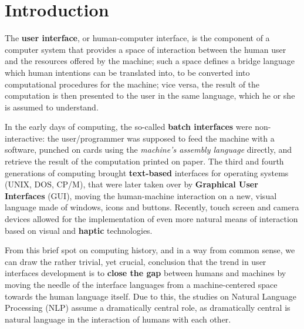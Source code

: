 
\chapter{Introduction} %

\label{ch:Introduction} %




The \textbf{user interface}, or human-computer interface, is the component of a computer system that provides a space of interaction between the human user and the resources offered by the machine; such a space defines a bridge language which human intentions can be translated into, to be converted into computational procedures for the machine; vice versa, the result of the computation is then presented to the user in the same language, which he or she is assumed to understand.

In the early days of computing, the so-called \textbf{batch interfaces} were non-interactive: the user/programmer was supposed to feed the machine with a software, punched on cards using the \textit{machine's assembly language} directly, and retrieve the result of the computation printed on paper. The third and fourth generations of computing brought \textbf{text-based} interfaces for operating systems (UNIX, DOS, CP/M), that were later taken over by \textbf{Graphical User Interfaces} (GUI), moving the human-machine interaction on a new, visual language made of windows, icons and buttons. Recently, touch screen and camera devices allowed for the implementation of even more natural means of interaction based on visual and \textbf{haptic} technologies.

From this brief spot on computing history, and in a way from common sense, we can draw the rather trivial, yet crucial, conclusion that the trend in user interfaces development is to \textbf{close the gap} between humans and machines by moving the needle of the interface languages from a machine-centered space towards the human language itself. Due to this, the studies on Natural Language Processing (NLP) assume a dramatically central role, as dramatically central is natural language in the interaction of humans with each other.

